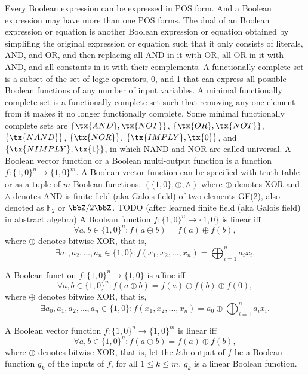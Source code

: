 \documentclass[a4paper,12pt]{article}
\begin{document}
\begin{itemize}
\begin{itemize}
\begin{itemize}
\begin{itemize}
\begin{itemize}
\begin{itemize}
\begin{itemize}
\begin{itemize}
\begin{itemize}
Every Boolean expression can be expressed in POS form. And a Boolean expression may have more than one POS forms.
The dual of an Boolean expression or equation is another Boolean expression or equation obtained by simplifing the original expression or equation such that it only consists of literals, AND, and OR, and then replacing all AND in it with OR, all OR in it with AND, and all constants in it with their complements.
A functionally complete set is a subset of the set of logic operators, 0, and 1 that can express all possible Boolean functions of any number of input variables. A minimal functionally complete set is a functionally complete set such that removing any one element from it makes it no longer functionally complete. Some minimal functionally complete sets are $\{\tx{AND},\tx{NOT}\}$, $\{\tx{OR},\tx{NOT}\}$, $\{\tx{NAND}\}$, $\{\tx{NOR}\}$, $\{\tx{IMPLY},\tx{0}\}$, and $\{\tx{NIMPLY},\tx{1}\}$, in which NAND and NOR are called universal.
A Boolean vector function or a Boolean multi-output function is a function $f\colon\{1,0\}^n\to\{1,0\}^m$. A Boolean vector function can be specified with truth table or as a tuple of $m$ Boolean functions.
$(\{1,0\},\oplus,\land)$ where $\oplus$ denotes XOR and $\land$ denotes AND is finite field (aka Galois field) of two elements GF(2), also denoted as $\mathbb{F}_2$ or $\bbZ/2\bbZ$.
TODO
(after learned finite field (aka Galois field) in abstract algebra)
A Boolean function $f\colon\{1,0\}^n\to\{1,0\}$ is linear iff
\[\forall a,b\in\{1,0\}^n\colon f(a\oplus b)=f(a)\oplus f(b),\]
where $\oplus$ denotes bitwise XOR, that is,
\[\exists a_1,a_2,\ldots,a_n\in\{1,0\}\colon f(x_1,x_2,\ldots,x_n)=\bigoplus_{i=1}^na_ix_i.\]

A Boolean function $f\colon\{1,0\}^n\to\{1,0\}$ is affine iff
\[\forall a,b\in\{1,0\}^n\colon f(a\oplus b)=f(a)\oplus f(b)\oplus f(0),\]
where $\oplus$ denotes bitwise XOR, that is,
\[\exists a_0,a_1,a_2,\ldots,a_n\in\{1,0\}\colon f(x_1,x_2,\ldots,x_n)=a_0\oplus\bigoplus_{i=1}^na_ix_i.\]

A Boolean vector function $f\colon\{1,0\}^n\to\{1,0\}^m$ is linear iff
\[\forall a,b\in\{1,0\}^n\colon f(a\oplus b)=f(a)\oplus f(b),\]
where $\oplus$ denotes bitwise XOR, that is, let the $k$th output of $f$ be a Boolean function $g_k$ of the inputs of $f$, for all $1\leq k\leq m$, $g_k$ is a linear Boolean function.


\end{itemize}
\end{itemize}
\end{itemize}
\end{itemize}
\end{itemize}
\end{itemize}
\end{itemize}
\end{itemize}
\end{itemize}
\end{document}
